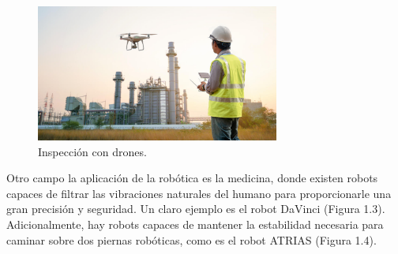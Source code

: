 \documentclass[a4paper, 12pt]{book}
\begin{document}
\begin{figure}[H]
	\centering
    \includegraphics[width=8cm, keepaspectratio]{img/inpeccion_drones.jpg}
    \caption{Inspección con drones.}
    \label{figura:inspeccion_drones´}
\end{figure}

Otro campo la aplicación de la robótica es la medicina, donde existen robots capaces de filtrar las vibraciones naturales del humano para proporcionarle una gran precisión y seguridad. Un claro ejemplo es el robot DaVinci (Figura 1.3). Adicionalmente, hay robots capaces de mantener la estabilidad necesaria para caminar sobre dos piernas robóticas, como es el robot ATRIAS (Figura 1.4).
\end{document}

